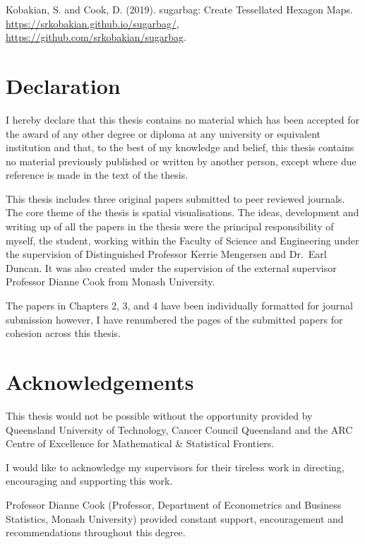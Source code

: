 \documentclass{monashthesis}
\begin{document}
Kobakian, S. and Cook, D. (2019). sugarbag: Create Tessellated Hexagon Maps. \url{https://srkobakian.github.io/sugarbag/}, \url{https://github.com/srkobakian/sugarbag}.

\clearpage{}\setcounter{page}{0}

\hypertarget{declaration}{%
\chapter*{Declaration}\label{declaration}}

I hereby declare that this thesis contains no material which has been accepted for the award of any other degree or diploma at any university or equivalent institution and that, to the best of my knowledge and belief, this thesis contains no material previously published or written by another person, except where due reference is made in the text of the thesis.

This thesis includes three original papers submitted to peer reviewed journals. The core theme of the thesis is spatial visualisations. The ideas, development and writing up of all the papers in the thesis were the principal responsibility of myself, the student, working within the Faculty of Science and Engineering under the supervision of Distinguished Professor Kerrie Mengersen and Dr.~Earl Duncan. It was also created under the supervision of the external supervisor Professor Dianne Cook from Monash University.

The papers in Chapters 2, 3, and 4 have been individually formatted for journal submission however, I have renumbered the pages of the submitted papers for cohesion across this thesis.

\hypertarget{acknowledgements}{%
\chapter*{Acknowledgements}\label{acknowledgements}}

This thesis would not be possible without the opportunity provided by Queensland University of Technology, Cancer Council Queensland and the ARC Centre of Excellence for Mathematical \& Statistical Frontiers.

I would like to acknowledge my supervisors for their tireless work in directing, encouraging and supporting this work.

Professor Dianne Cook (Professor, Department of Econometrics and Business Statistics, Monash University) provided constant support, encouragement and recommendations throughout this degree.
\end{document}
